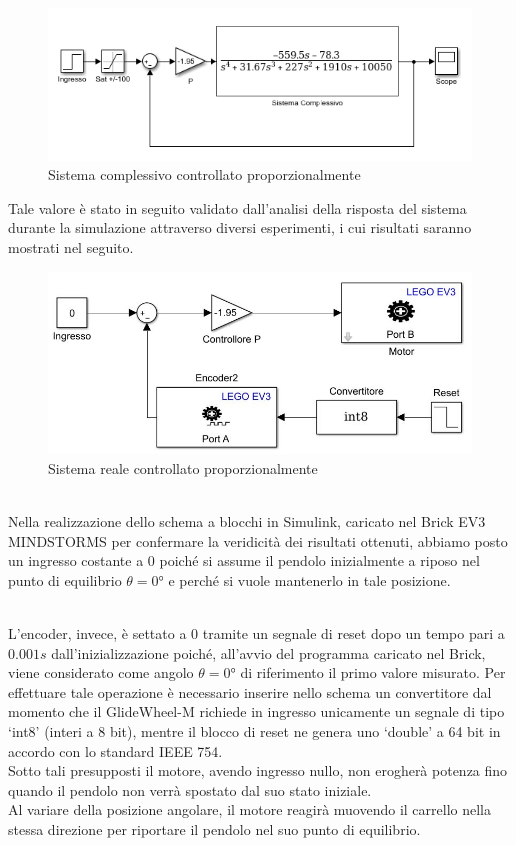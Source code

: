 \begin{figure}[ht]
	\centering
	\includegraphics[width=\textwidth]{SisComplessivoPNRetroazionato.PNG}
	\caption{Sistema complessivo controllato proporzionalmente}
	\label{SisComplessivoPNRetroazionato}
\end{figure}

Tale valore è stato in seguito validato dall'analisi della risposta del sistema  durante la simulazione attraverso diversi esperimenti, i cui risultati saranno mostrati nel seguito.
\begin{figure}[ht]
	\centering
	\includegraphics[width=\textwidth]{pendoloReale.png}
	\caption{Sistema reale controllato proporzionalmente}
	\label{pendoloReale}
\end{figure}
\\Nella realizzazione dello schema a blocchi in Simulink, caricato nel Brick EV3 MINDSTORMS per confermare la veridicità dei risultati ottenuti, abbiamo posto un ingresso costante a 0 poiché si assume il pendolo inizialmente a riposo nel punto di equilibrio $\theta=\ang{0}$ e perché si vuole mantenerlo in tale posizione.

\\L'encoder, invece, è settato a $0$ tramite un segnale di reset dopo un tempo pari a $0.001s$ dall'inizializzazione poiché, all'avvio del programma caricato nel Brick, viene considerato come angolo $\theta=\ang{0}$ di riferimento il primo valore misurato.
Per effettuare tale operazione è necessario inserire nello schema un convertitore dal momento che il GlideWheel-M richiede in ingresso unicamente un segnale di tipo `int8' (interi a 8 bit), mentre il blocco di reset ne genera uno `double' a 64 bit in accordo con lo standard IEEE 754.\\
Sotto tali presupposti il motore, avendo ingresso nullo, non erogherà potenza fino quando il pendolo non verrà spostato dal suo stato iniziale.\\
Al variare della posizione angolare, il motore reagirà muovendo il carrello nella stessa direzione per riportare il pendolo nel suo punto di equilibrio.

